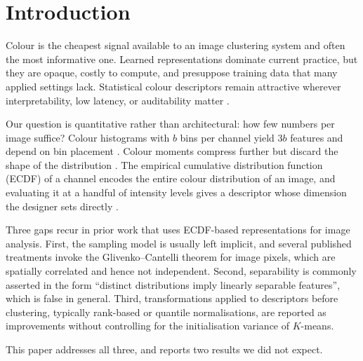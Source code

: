 \documentclass[pdflatex,sn-basic]{sn-jnl}
\theoremstyle{thmstyleone}%
\theoremstyle{thmstyletwo}%
\theoremstyle{thmstylethree}%
\begin{document}

\maketitle

\section{Introduction}\label{sec:intro}

Colour is the cheapest signal available to an image clustering system and often
the most informative one. Learned representations dominate current practice,
but they are opaque, costly to compute, and presuppose training data that many
applied settings lack. Statistical colour descriptors remain attractive
wherever interpretability, low latency, or auditability matter
\cite{ref:jain2010,ref:rudin2019}.

Our question is quantitative rather than architectural: how few numbers per
image suffice? Colour histograms with $b$ bins per channel yield $3b$ features
and depend on bin placement \cite{ref:swain1991}. Colour moments compress
further but discard the shape of the distribution \cite{ref:stricker1995}. The
empirical cumulative distribution function (ECDF) of a channel encodes the
entire colour distribution of an image, and evaluating it at a handful of
intensity levels gives a descriptor whose dimension the designer sets directly
\cite{ref:van2016}.

Three gaps recur in prior work that uses ECDF-based representations for image
analysis. First, the sampling model is usually left implicit, and several
published treatments invoke the Glivenko--Cantelli theorem for image pixels,
which are spatially correlated and hence not independent. Second, separability
is commonly asserted in the form ``distinct distributions imply linearly
separable features'', which is false in general. Third, transformations applied
to descriptors before clustering, typically rank-based or quantile
normalisations, are reported as improvements without controlling for the
initialisation variance of $K$-means.

This paper addresses all three, and reports two results we did not expect.
\end{document}
